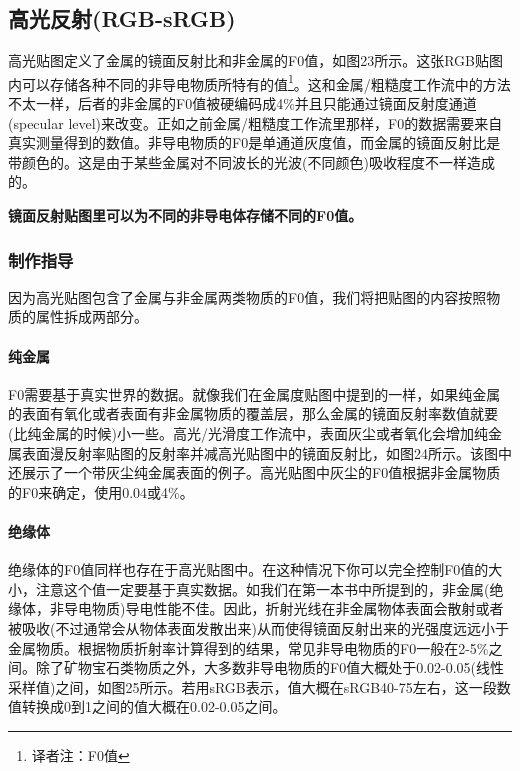 \subsection{高光反射(RGB-sRGB)}

高光贴图定义了金属的镜面反射比和非金属的F0值，如图23所示。这张RGB贴图内可以存储各种不同的非导电物质所特有的值\footnote{译者注：F0值}。这和金属/粗糙度工作流中的方法不太一样，后者的非金属的F0值被硬编码成4\%并且只能通过镜面反射度通道(specular level)来改变。正如之前金属/粗糙度工作流里那样，F0的数据需要来自真实测量得到的数值。非导电物质的F0是单通道灰度值，而金属的镜面反射比是带颜色的。这是由于某些金属对不同波长的光波(不同颜色)吸收程度不一样造成的。

\textbf{镜面反射贴图里可以为不同的非导电体存储不同的F0值。}

\subsubsection{制作指导}

因为高光贴图包含了金属与非金属两类物质的F0值，我们将把贴图的内容按照物质的属性拆成两部分。

\paragraph{纯金属}

F0需要基于真实世界的数据。就像我们在金属度贴图中提到的一样，如果纯金属的表面有氧化或者表面有非金属物质的覆盖层，那么金属的镜面反射率数值就要(比纯金属的时候)小一些。高光/光滑度工作流中，表面灰尘或者氧化会增加纯金属表面漫反射率贴图的反射率并减高光贴图中的镜面反射比，如图24所示。该图中还展示了一个带灰尘纯金属表面的例子。高光贴图中灰尘的F0值根据非金属物质的F0来确定，使用0.04或4\%。

\paragraph{绝缘体}

绝缘体的F0值同样也存在于高光贴图中。在这种情况下你可以完全控制F0值的大小，注意这个值一定要基于真实数据。如我们在第一本书中所提到的，非金属(绝缘体，非导电物质)导电性能不佳。因此，折射光线在非金属物体表面会散射或者被吸收(不过通常会从物体表面发散出来)从而使得镜面反射出来的光强度远远小于金属物质。根据物质折射率计算得到的结果，常见非导电物质的F0一般在2-5\%之间。除了矿物宝石类物质之外，大多数非导电物质的F0值大概处于0.02-0.05(线性采样值)之间，如图25所示。若用sRGB表示，值大概在sRGB40-75左右，这一段数值转换成0到1之间的值大概在0.02-0.05之间。

